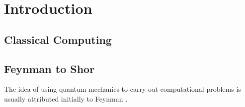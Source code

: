 \chapter{Introduction}

\section{Classical Computing}

\section{Feynman to Shor}
The idea of using quantum mechanics to carry out computational problems is usually attributed initially to Feynman \cite{feynman}.
